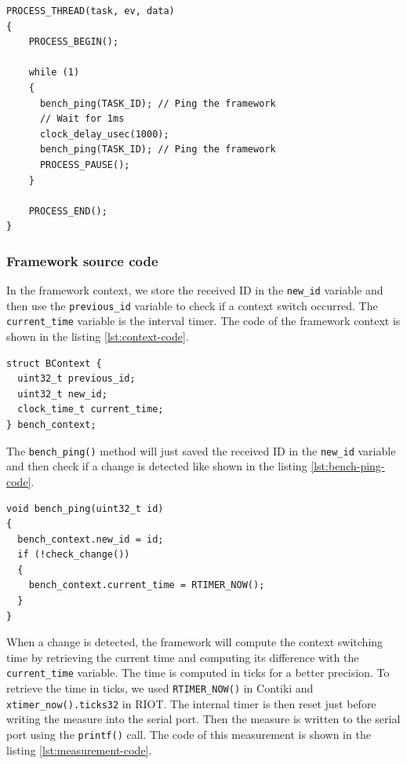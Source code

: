 \begin{lstlisting}[float, style=CStyle, label={lst:bench-task-code}, caption={source code of the application task with \texttt{bench\_ping()} calls}]
PROCESS_THREAD(task, ev, data)
{
    PROCESS_BEGIN();

    while (1)
    {
      bench_ping(TASK_ID); // Ping the framework
      // Wait for 1ms
      clock_delay_usec(1000);
      bench_ping(TASK_ID); // Ping the framework
      PROCESS_PAUSE();
    }

    PROCESS_END();
}
\end{lstlisting}

\subsubsection{Framework source code}

In the framework context, we store the received ID in the \texttt{new\_id} variable 
  and then use the \texttt{previous\_id} variable to check if a context switch occurred.
The \texttt{current\_time} variable is the interval timer.
The code of the framework context is shown in the listing \ref{lst:context-code}.

\begin{lstlisting}[style=CStyle, float, label={lst:context-code}, caption={framework context implementation}]
struct BContext {
  uint32_t previous_id;
  uint32_t new_id;
  clock_time_t current_time;
} bench_context;
\end{lstlisting}

The \texttt{bench\_ping()} method will just saved the received ID in the \texttt{new\_id} variable 
  and then check if a change is detected like shown in the listing \ref{lst:bench-ping-code}.

\begin{lstlisting}[style=CStyle, float, label={lst:bench-ping-code}, caption={\texttt{bench\_ping()} implementation}]
void bench_ping(uint32_t id)
{
  bench_context.new_id = id;
  if (!check_change())
  {
    bench_context.current_time = RTIMER_NOW();
  }
}
\end{lstlisting}

When a change is detected, the framework will compute the context switching time 
  by retrieving the current time and computing its difference with the \texttt{current\_time} variable.
The time is computed in ticks for a better precision.
To retrieve the time in ticks, we used \texttt{RTIMER\_NOW()} in Contiki and \texttt{xtimer\_now().ticks32} in RIOT.
The internal timer is then reset just before writing the measure into the serial port.
Then the measure is written to the serial port using the \texttt{printf()} call.
The code of this measurement is shown in the listing \ref{lst:measurement-code}.

